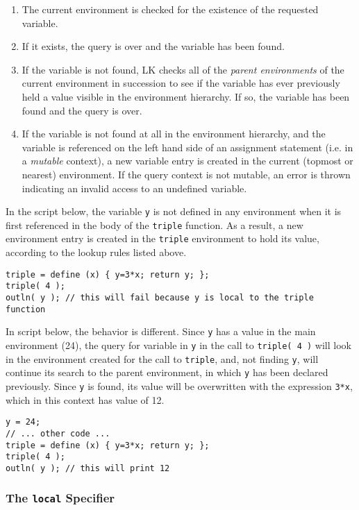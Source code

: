 \documentclass{article}
\begin{document}
\begin{enumerate}
\item The current environment is checked for the existence of the requested variable.
\item If it exists, the query is over and the variable has been found.
\item If the variable is not found, LK checks all of the \emph{parent environments} of the current environment in succession to see if the variable has ever previously held a value visible in the environment hierarchy.  If so, the variable has been found and the query is over.
\item If the variable is not found at all in the environment hierarchy, and the variable is referenced on the left hand side of an assignment statement (i.e. in a \emph{mutable} context), a new variable entry is created in the current (topmost or nearest) environment.  If the query context is not mutable, an error is thrown indicating an invalid access to an undefined variable.
\end{enumerate}

In the script below, the variable \texttt{y} is not defined in any environment when it is first referenced in the body of the \texttt{triple} function.  As a result, a new environment entry is created in the \texttt{triple} environment to hold its value, according to the lookup rules listed above.

\begin{verbatim}
triple = define (x) { y=3*x; return y; };
triple( 4 );
outln( y ); // this will fail because y is local to the triple function
\end{verbatim}

In script below, the behavior is different.  Since \texttt{y} has a value in the main environment (24), the query for variable in \texttt{y} in the call to \texttt{triple( 4 )} will look in the environment created for the call to \texttt{triple}, and, not finding \texttt{y}, will continue its search to the parent environment, in which \texttt{y} has been declared previously.  Since \texttt{y} is found, its value will be overwritten with the expression \texttt{3*x}, which in this context has value of 12.

\begin{verbatim}
y = 24;
// ... other code ...
triple = define (x) { y=3*x; return y; };
triple( 4 );
outln( y ); // this will print 12
\end{verbatim}

\subsubsection{The \texttt{local} Specifier}
\end{document}
